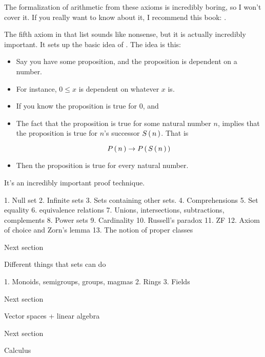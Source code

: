 The formalization of arithmetic from these axioms is incredibly boring, so I
won't cover it. If you really want to know about it, I recommend this book:
.

The fifth axiom in that list sounds like nonsense, but it is actually incredibly
important. It sets up the basic idea of . The idea
is this:

\begin{itemize}
  \item Say you have some proposition, and the proposition is dependent on a
    number.
  \item For instance, $0 \le x$ is dependent on whatever $x$ is.
  \item If you know the proposition is true for $0$, and
  \item The fact that the proposition is true for some natural number $n$,
    implies that the proposition is true for $n$'s successor $S \left(\, n \,\right)$. That is

    \begin{equation}
        P \left(\, n \,\right) \rightarrow P \left(\, S \left(\, n \,\right) \,\right)
    \end{equation}
  \item Then the proposition is true for every natural number.
\end{itemize}

It's an incredibly important proof technique.

1. Null set
2. Infinite sets
3. Sets containing other sets.
4. Comprehensions
5. Set equality
6. equivalence relations
7. Unions, intersections, subtractions, complements
8. Power sets
9. Cardinality
10. Russell's paradox
11. ZF
12. Axiom of choice and Zorn's lemma
13. The notion of proper classes

Next section

Different things that sets can do

1. Monoids, semigroups, groups, magmas
2. Rings
3. Fields

Next section

Vector spaces + linear algebra

Next section

Calculus



